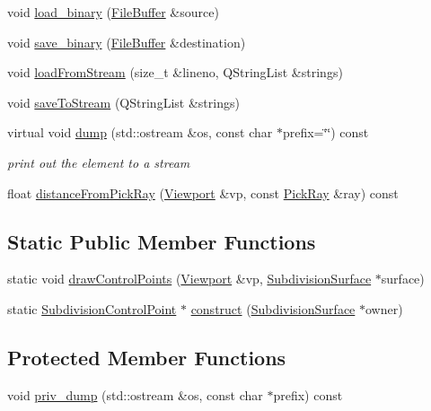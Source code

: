\begin{DoxyCompactItemize}
\item 
void \hyperlink{classShipCAD_1_1SubdivisionControlPoint_a989c801ca1c836ca73f77c68d719f546}{load\-\_\-binary} (\hyperlink{classShipCAD_1_1FileBuffer}{File\-Buffer} \&source)
\item 
void \hyperlink{classShipCAD_1_1SubdivisionControlPoint_a7de1a32ae9e845478ec1bd5eaec17cd1}{save\-\_\-binary} (\hyperlink{classShipCAD_1_1FileBuffer}{File\-Buffer} \&destination)
\item 
void \hyperlink{classShipCAD_1_1SubdivisionControlPoint_aba97c3c0d7ebfcd98458931645ffacd0}{load\-From\-Stream} (size\-\_\-t \&lineno, Q\-String\-List \&strings)
\item 
void \hyperlink{classShipCAD_1_1SubdivisionControlPoint_aa9175d20a34a9b3e964efbb436ac3dbc}{save\-To\-Stream} (Q\-String\-List \&strings)
\item 
virtual void \hyperlink{classShipCAD_1_1SubdivisionControlPoint_a4a9d6e45291c27f19f0d76c9b9d19048}{dump} (std\-::ostream \&os, const char $\ast$prefix=\char`\"{}\char`\"{}) const 
\begin{DoxyCompactList}\small\item\em print out the element to a stream \end{DoxyCompactList}\item 
float \hyperlink{classShipCAD_1_1SubdivisionControlPoint_af6148a12f92a65efe935e70394c1a4ca}{distance\-From\-Pick\-Ray} (\hyperlink{classShipCAD_1_1Viewport}{Viewport} \&vp, const \hyperlink{structShipCAD_1_1PickRay}{Pick\-Ray} \&ray) const 
\end{DoxyCompactItemize}
\subsection*{Static Public Member Functions}
\begin{DoxyCompactItemize}
\item 
static void \hyperlink{classShipCAD_1_1SubdivisionControlPoint_a761599371138b34be2c7a2cac3699e2c}{draw\-Control\-Points} (\hyperlink{classShipCAD_1_1Viewport}{Viewport} \&vp, \hyperlink{classShipCAD_1_1SubdivisionSurface}{Subdivision\-Surface} $\ast$surface)
\item 
static \hyperlink{classShipCAD_1_1SubdivisionControlPoint}{Subdivision\-Control\-Point} $\ast$ \hyperlink{classShipCAD_1_1SubdivisionControlPoint_adc189f3e5cff85ecd1a59356e0f7d63d}{construct} (\hyperlink{classShipCAD_1_1SubdivisionSurface}{Subdivision\-Surface} $\ast$owner)
\end{DoxyCompactItemize}
\subsection*{Protected Member Functions}
\begin{DoxyCompactItemize}
\item 
void \hyperlink{classShipCAD_1_1SubdivisionControlPoint_a01e1eff38ecb4393948db0d9883cad84}{priv\-\_\-dump} (std\-::ostream \&os, const char $\ast$prefix) const 
\end{DoxyCompactItemize}

